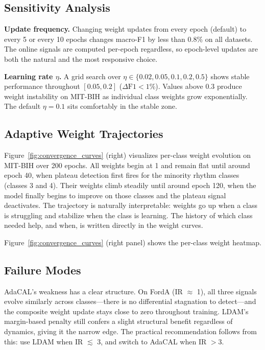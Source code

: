 \documentclass[letterpaper]{article}
\begin{document}
\subsection{Sensitivity Analysis}

\textbf{Update frequency.} Changing weight updates from every epoch (default) to every 5 or every 10 epochs changes macro-F1 by less than 0.8\% on all datasets. The online signals are computed per-epoch regardless, so epoch-level updates are both the natural and the most responsive choice.

\textbf{Learning rate $\eta$.} A grid search over $\eta \in \{0.02, 0.05, 0.1, 0.2, 0.5\}$ shows stable performance throughout $[0.05, 0.2]$ ($\Delta\text{F1} < 1\%$). Values above 0.3 produce weight instability on MIT-BIH as individual class weights grow exponentially. The default $\eta = 0.1$ sits comfortably in the stable zone.

\subsection{Adaptive Weight Trajectories}

Figure~\ref{fig:convergence_curves} (right) visualizes per-class weight evolution on MIT-BIH over 200 epochs. All weights begin at 1 and remain flat until around epoch 40, when plateau detection first fires for the minority rhythm classes (classes 3 and 4). Their weights climb steadily until around epoch 120, when the model finally begins to improve on those classes and the plateau signal deactivates. The trajectory is naturally interpretable: weights go up when a class is struggling and stabilize when the class is learning. The history of which class needed help, and when, is written directly in the weight curves.

Figure~\ref{fig:convergence_curves} (right panel) shows the per-class weight heatmap.


\subsection{Failure Modes}

AdaCAL's weakness has a clear structure. On FordA (IR $\approx$ 1), all three signals evolve similarly across classes---there is no differential stagnation to detect---and the composite weight update stays close to zero throughout training. LDAM's margin-based penalty still confers a slight structural benefit regardless of dynamics, giving it the narrow edge. The practical recommendation follows from this: use LDAM when IR $\lesssim$ 3, and switch to AdaCAL when IR $> 3$.
\end{document}
